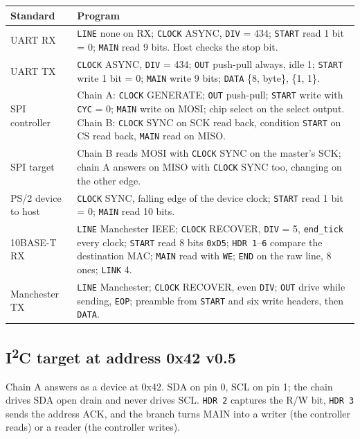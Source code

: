 \documentclass[11pt,a4paper]{article}
\newcommand{\vfive}{\textcolor{fivec}{\textsf{\small v0.5}}}
\newcommand{\sig}[1]{\texttt{#1}}
\begin{document}
\begin{center}
\begin{tabularx}{\linewidth}{@{}l>{\raggedright\arraybackslash}X@{}}
\toprule
Standard & Program \\
\midrule
UART RX & \sig{LINE} none on RX; \sig{CLOCK} ASYNC, \sig{DIV} = 434; \sig{START} read 1 bit = 0; \sig{MAIN} read 9 bits. Host checks the stop bit. \\
UART TX & \sig{CLOCK} ASYNC, \sig{DIV} = 434; \sig{OUT} push-pull always, idle 1; \sig{START} write 1 bit = 0; \sig{MAIN} write 9 bits; \sig{DATA} \{8, byte\}, \{1, 1\}. \\
SPI controller & Chain A: \sig{CLOCK} GENERATE; \sig{OUT} push-pull; \sig{START} write with \sig{CYC} = 0; \sig{MAIN} write on MOSI; chip select on the select output. Chain B: \sig{CLOCK} SYNC on SCK read back, condition \sig{START} on CS read back, \sig{MAIN} read on MISO. \\
SPI target & Chain B reads MOSI with \sig{CLOCK} SYNC on the master's SCK; chain A answers on MISO with \sig{CLOCK} SYNC too, changing on the other edge. \\
PS/2 device to host & \sig{CLOCK} SYNC, falling edge of the device clock; \sig{START} read 1 bit = 0; \sig{MAIN} read 10 bits. \\
10BASE-T RX & \sig{LINE} Manchester IEEE; \sig{CLOCK} RECOVER, \sig{DIV} = 5, \sig{end\_tick} every clock; \sig{START} read 8 bits \texttt{0xD5}; \sig{HDR 1}--\sig{6} compare the destination MAC; \sig{MAIN} read with \sig{WE}; \sig{END} on the raw line, 8 ones; \sig{LINK} 4. \\
Manchester TX & \sig{LINE} Manchester; \sig{CLOCK} RECOVER, even \sig{DIV}; \sig{OUT} drive while sending, \sig{EOP}; preamble from \sig{START} and six write headers, then \sig{DATA}. \\
\bottomrule
\end{tabularx}
\end{center}

\subsection{I\textsuperscript{2}C target at address 0x42 \vfive}

Chain A answers as a device at 0x42. SDA on pin 0, SCL on pin 1; the chain drives SDA open drain and never drives SCL. \sig{HDR 2} captures the R/W bit, \sig{HDR 3} sends the address ACK, and the branch turns MAIN into a writer (the controller reads) or a reader (the controller writes).
\end{document}
